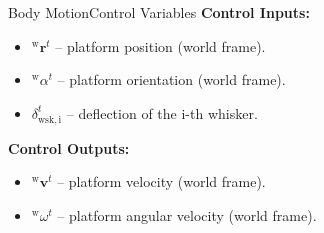\documentclass[AIRbeamer
,optEnglish
,optBiber
,optBibstyleAlphabetic
,optBeamerClassicFormat%
]{AIRlatex}
\begin{document}
    \begin{frame}{Body Motion}{Control Variables}
        \textbf{Control Inputs:}
        \begin{itemize}
            \item \(^{\mathrm{w}}\boldsymbol{r}^{t}\) -- platform position (world frame).
            \item \(^{\mathrm{w}}\alpha^{t}\) -- platform orientation (world frame).
            \item \(\delta_{\mathrm{wsk,i}}^{t}\) -- deflection of the i-th whisker.
        \end{itemize}

        \textbf{Control Outputs:}
        \begin{itemize}
            \item \(^{\mathrm{w}}\boldsymbol{v}^{t}\) -- platform velocity (world frame).
            \item \(^{\mathrm{w}}\omega^{t}\) -- platform angular velocity (world frame).
        \end{itemize}
    \end{frame}
\end{document}
